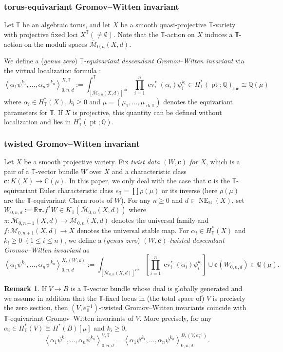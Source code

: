 \documentclass[a4paper,12pt]{amsart}
\numberwithin{equation}{section}
\theoremstyle{definition}
\newtheorem{remark}[theorem]{Remark}
\newcommand{\C}{\mathbb{C}}
\newcommand{\N}{\mathbb{N}}
\newcommand{\Q}{\mathbb{Q}}
\newcommand{\R}{\mathbb{R}}
\newcommand{\T}{\mathbb{T}}
\newcommand{\bc}{\boldsymbol{c}}
\newcommand{\cM}{\mathcal{M}}
\newcommand{\ovcM}{\overline{\cM}}
\newcommand{\ev}{\operatorname{ev}}
\newcommand{\loc}{{\operatorname{loc}}}
\newcommand{\pt}{\operatorname{pt}}
\newcommand{\vir}{{\operatorname{vir}}}
\newcommand{\NE}{\operatorname{NE}_{\N}}
\def\corr#1{\left\langle#1 \right\rangle}
\begin{document}
\subsubsection{torus-equivariant Gromov--Witten invariant}

Let $\T$ be an algebraic torus, and let $X$ be a smooth quasi-projective $\T$-variety with projective fixed loci $X^\T(\neq\emptyset)$.
Note that the $\T$-action on $X$ induces a $\T$-action on the moduli spaces $\ovcM_{0,n}(X,d)$.

We define a (\emph{genus zero}) \emph{$\T$-equivariant descendant Gromov--Witten invariant} via the virtual localization formula \cite{GP}:
\[
\corr{\alpha_1\psi^{k_1},\dots,\alpha_n\psi^{k_n}}^{X,\T}_{0,n,d} := \int_{[\ovcM_{0,n}(X,d)]^{\vir}}^\T\prod^n_{i=1}\ev^*_i(\alpha_i)\psi_i^{k_i}\in H^*_\T(\pt;\Q)_\loc\cong\Q({\mu})
\]
where $\alpha_i\in H^*_\T(X)$, $k_i\geq0$ and $\mu=(\mu_1,\dots ,\mu_{\operatorname{rk}\T})$ denotes the equivariant parameters for $\T$.
If $X$ is projective, this quantity can be defined without localization and lies in $H^*_\T(\pt;\Q)$.


\subsubsection{twisted Gromov--Witten invariant}
Let $X$ be a smooth projective variety.
Fix \emph{twist data $(W,\bc)$ for $X$}, which is a pair of a $\T$-vector bundle $W$ over $X$ and a characteristic class $\bc\colon K(X)\to \C(\mu)$.
In this paper, we only deal with the case that $\bc$ is the $\T$-equivariant Euler characteristic class $e_\T=\prod\rho(\mu)$ or its inverse (here $\rho(\mu)$ are the $\T$-equivariant Chern roots of $W$).
For any $n\geq0$ and $d\in\NE(X)$, set $W_{0,n,d}:=\R\pi_*f^*W\in K_\T(\ovcM_{0,n}(X,d))$ where $\pi\colon \ovcM_{0,n+1}(X,d)\to\ovcM_{0,n}(X,d)$ denotes the universal family and $f\colon \ovcM_{0,n+1}(X,d)\to X$ denotes the universal stable map.
For $\alpha_i\in H^*_\T(X)$ and $k_i\geq0$ $(1\leq i\leq n)$, we define a (\emph{genus zero}) \emph{$(W,\bc)$-twisted descendant Gromov--Witten invariant} as 
\[
\corr{\alpha_1\psi^{k_1},\dots,\alpha_n\psi^{k_n}}^{X,(W,\bc)}_{0,n,d} := \int_{[\ovcM_{0,n}(X,d)]^{\vir}}\left[\prod^n_{i=1}\ev^*_i(\alpha_i)\psi_i^{k_i}\right]\cup\bc(W_{0,n,d})\in\Q(\mu).
\]

\begin{remark}\label{rmk:GW_bundle}
    If $V\to B$ is a $\T$-vector bundle whose dual is globally generated and we assume in addition that the $\T$-fixed locus in (the total space of) $V$ is precisely the zero section, then $(V,e_\T^{-1})$-twisted Gromov--Witten invariants coincide with $\T$-equivariant Gromov--Witten invariants of $V$.
    More precisely, for any $\alpha_i\in H^*_\T(V)\cong H^*(B)[\mu]$ and $k_i\geq0$,
    \[
    \corr{\alpha_1\psi^{k_1},\dots,\alpha_n\psi^{k_n}}^{V,\T}_{0,n,d} = \corr{\alpha_1\psi^{k_1},\dots,\alpha_n\psi^{k_n}}^{B,(V,e_\T^{-1})}_{0,n,d}.
    \]
\end{remark}
\end{document}
